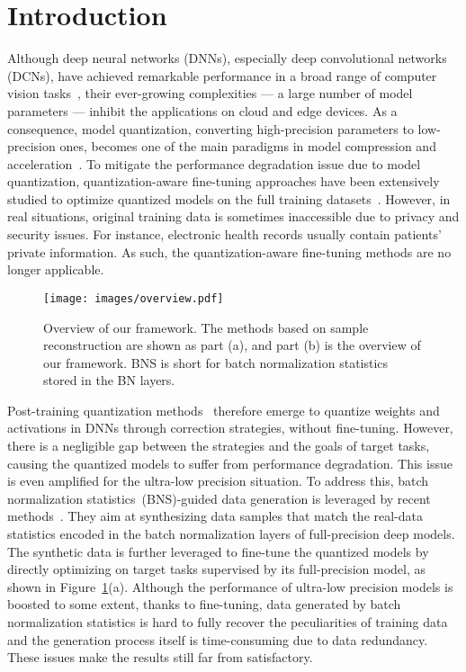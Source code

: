 \documentclass[final]{cvpr}
\begin{document}
\section{Introduction}

Although deep neural networks (DNNs), especially deep convolutional networks (DCNs), have achieved remarkable performance in a broad range of computer vision tasks~\cite{krizhevsky2012imagenet,toshev2014deeppose,long2015fully,ren2017faster}, their ever-growing complexities --- a large number of model parameters --- inhibit the applications on cloud and edge devices.
As a consequence, model quantization, converting high-precision parameters to low-precision ones, becomes one of the main paradigms in model compression and acceleration~\cite{DengLHSX20}. 
To mitigate the performance degradation issue due to model quantization, quantization-aware fine-tuning approaches have been extensively studied to optimize quantized models on the full training datasets~\cite{wu2016quantized,jacob2018quantization,shen2020q}.
However, in real situations, original training data is sometimes inaccessible due to privacy and security issues.
For instance, electronic health records usually contain patients' private information.
As such, the quantization-aware fine-tuning methods are no longer applicable. 

\begin{figure}[tbp]
  \centering
  \texttt{[image: images/overview.pdf]}
  \caption{Overview of our framework. The methods based on sample reconstruction are shown as part (a), and part (b) is the overview of our framework. BNS is short for batch normalization statistics stored in the BN layers.}
  \label{fig:overview}
\end{figure}

Post-training quantization methods~\cite{banner2018aciq,nagel2019data,zhao2019improving} therefore emerge to quantize weights and activations in DNNs through correction strategies, without fine-tuning.
However, there is a negligible gap between the strategies and the goals of target tasks, causing the quantized models to suffer from performance degradation.
This issue is even amplified for the ultra-low precision situation. 
To address this, batch normalization statistics~(BNS)-guided data generation is leveraged by recent methods~\cite{cai2020zeroq,xu2020generative}.
They aim at synthesizing data samples that match the real-data statistics encoded in the batch normalization layers of full-precision deep models.
The synthetic data is further leveraged to fine-tune the quantized models by directly optimizing on target tasks supervised by its full-precision model, as shown in Figure~\ref{fig:overview}(a).
Although the performance of ultra-low precision models is boosted to some extent, thanks to fine-tuning, data generated by batch normalization statistics is hard to fully recover the peculiarities of training data and the generation process itself is time-consuming due to data redundancy.
These issues make the results still far from satisfactory. 
\end{document}
